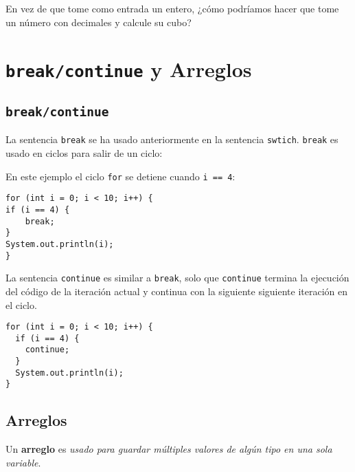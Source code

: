 \documentclass[12pt]{article}
\newcounter{it}
\theoremstyle{largebreak}
\begin{document}
    \begin{excer}
        En vez de que tome como entrada un entero, ¿cómo podríamos hacer que tome un número con decimales y calcule su cubo?
    \end{excer}

    \section{\lstinline|break/continue| y Arreglos}

    \subsection{\lstinline|break/continue|}
    
    La sentencia \lstinline|break| se ha usado anteriormente en la sentencia \lstinline|swtich|. \lstinline|break| es usado en ciclos para salir de un ciclo:

    \begin{exa}
        En este ejemplo el ciclo \lstinline|for| se detiene cuando \lstinline|i == 4|:
        \begin{lstlisting}[caption={Programa que sale de un ciclo \lstinline|for| al llegar al \lstinline|4|.},label=DescriptiveLabel]
for (int i = 0; i < 10; i++) {
if (i == 4) {
    break;
}
System.out.println(i);
}
        \end{lstlisting}
    \end{exa}

    La sentencia \lstinline|continue| es similar a \lstinline|break|, solo que \lstinline|continue| termina la ejecución del código de la iteración actual y continua con la siguiente siguiente iteración en el ciclo.

    \begin{exa}
        \begin{lstlisting}[caption={Programa usando el ciclo \lstinline|for| que no imprime \lstinline|4|.},label=DescriptiveLabel]
for (int i = 0; i < 10; i++) {
  if (i == 4) {
    continue;
  }
  System.out.println(i);
}
        \end{lstlisting}
    \end{exa}

    \subsection{Arreglos}

    \begin{mydef}
        Un \textbf{arreglo} es \textit{usado para guardar múltiples valores de algún tipo en una sola variable}.
    \end{mydef}
\end{document}
